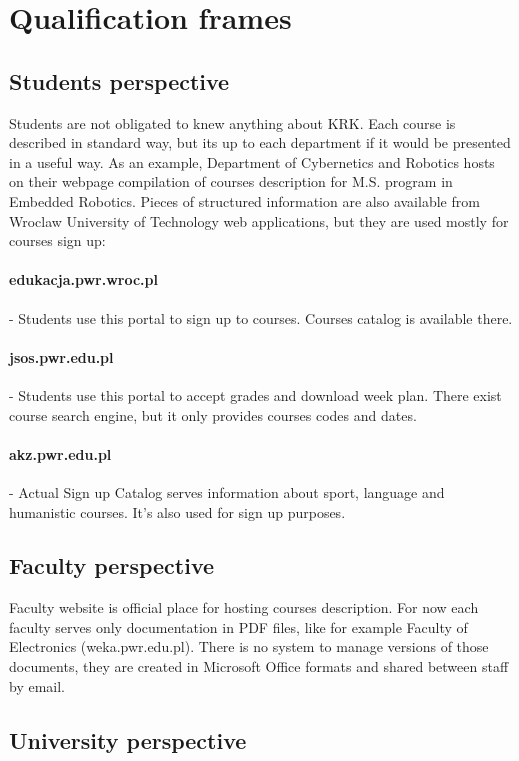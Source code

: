 \documentclass{report}
\begin{document}
\section{Qualification frames}

\subsection{Students perspective}
Students are not obligated to knew anything about KRK. Each course is described
in standard way, but its up to each department if it would be presented in a
useful way. As an example, Department of Cybernetics and Robotics hosts on
their webpage compilation of courses description for M.S. program in Embedded
Robotics\cite{web:aer-krk}. Pieces of structured information are also available
from Wroclaw University of Technology web applications, but they are used
mostly for courses sign up:
\paragraph{edukacja.pwr.wroc.pl} -
Students use this portal to sign up to courses. Courses catalog is available
there.
\paragraph{jsos.pwr.edu.pl} -
Students use this portal to accept grades and download week plan. There exist
course search engine, but it only provides courses codes and dates.
\paragraph{akz.pwr.edu.pl} -
Actual Sign up Catalog serves information about sport, language and
humanistic courses. It's also used for sign up purposes.


\subsection{Faculty perspective}
Faculty website is official place for hosting courses description. For now
each faculty serves only documentation in PDF files, like for example Faculty
of Electronics (weka.pwr.edu.pl). There is no system to manage versions of
those documents, they are created in Microsoft Office formats and shared
between staff by email.

\subsection{University perspective}
\end{document}
